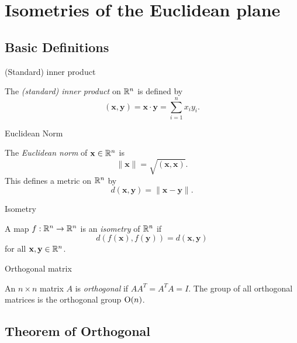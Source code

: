 \section{Isometries of the Euclidean plane}

\subsection{Basic Definitions}

\begin{frame}{(Standard) inner product}
    \begin{defi}
      The \emph{(standard) inner product} on $\mathbb{R}^n$ is defined by
      \[
        (\mathbf{x}, \mathbf{y}) = \mathbf{x}\cdot \mathbf{y} = \sum_{i = 1}^n x_i y_i.
      \]
    \end{defi}
\end{frame}

\begin{frame}{Euclidean Norm}
    \begin{defi}
      The \emph{Euclidean norm} of $\mathbf{x} \in \mathbb{R}^n$ is
      \[
        \|\mathbf{x}\| = \sqrt{(\mathbf{x}, \mathbf{x})}.
      \]
      This defines a metric on $\mathbb{R}^n$ by
      \[
        d(\mathbf{x}, \mathbf{y}) = \|\mathbf{x} - \mathbf{y}\|.
      \]
    \end{defi}
\end{frame}

\begin{frame}{Isometry}
    \begin{defi}[Isometry]
      A map $f: \mathbb{R}^n \to \mathbb{R}^n$ is an \emph{isometry} of $\mathbb{R}^n$ if
      \[
        d(f(\mathbf{x}), f(\mathbf{y})) = d(\mathbf{x}, \mathbf{y})
      \]
      for all $\mathbf{x}, \mathbf{y} \in \mathbb{R}^n$.
    \end{defi}
\end{frame}

\begin{frame}{Orthogonal matrix}
    \begin{defi}
      An $n \times n$ matrix $A$ is \emph{orthogonal} if $AA^T = A^T A = I$. The group of all orthogonal matrices is the orthogonal group $\mathrm{O}(n)$.
    \end{defi}
\end{frame}

\subsection{Theorem of Orthogonal}

